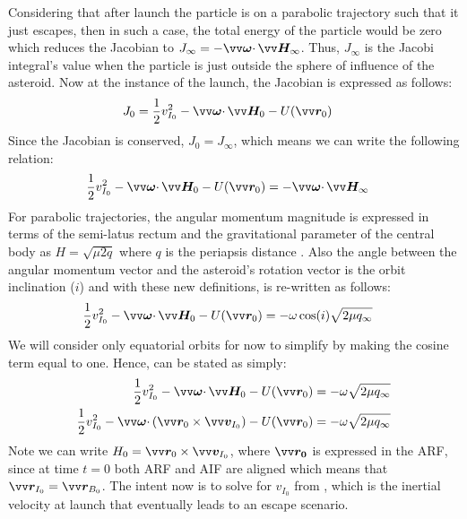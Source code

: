 Considering that after launch the particle is on a parabolic trajectory such that it just escapes, then in such a case, the total energy of the particle would be zero which reduces the Jacobian to $J_{\infty} = -\bv{\omega} \cdotp \bv{H}_{\infty}$. Thus, $J_{\infty}$ is the Jacobi integral's value when the particle is just outside the sphere of influence of the asteroid. Now at the instance of the launch, the Jacobian is expressed as follows:
\begin{align}
    J_0 &= \frac{1}{2} v_{I_0}^2 - \bv{\omega} \cdotp \bv{H}_0 - U(\bv{r}_0)
    \label{eqn:jacobian_t0}
\end{align}
Since the Jacobian is conserved, $J_0 = J_{\infty}$, which means we can write the following relation:
\begin{align}
    \frac{1}{2} v_{I_0}^2 - \bv{\omega} \cdotp \bv{H}_0 - U(\bv{r}_0) &= -\bv{\omega} \cdotp \bv{H}_{\infty}
    \label{eqn:jacobian_equate}
\end{align}
For parabolic trajectories, the angular momentum magnitude is expressed in terms of the semi-latus rectum and the gravitational parameter of the central body as $H = \sqrt{\mu 2q}$ where $q$ is the periapsis distance \parencite{schaub2003Book}. Also the angle between the angular momentum vector and the asteroid's rotation vector is the orbit inclination ($i$) and with these new definitions,  is re-written as follows:
\begin{align}
    \frac{1}{2} v_{I_0}^2 - \bv{\omega} \cdotp \bv{H}_0 - U(\bv{r}_0) &= -\omega \cos(i) \sqrt{2\mu q_{\infty}}
    \label{eqn:jacobian_equate_cosi}
\end{align}
We will consider only equatorial orbits for now to simplify  by making the cosine term equal to one. Hence,  can be stated as simply:
\begin{align}
    \frac{1}{2} v_{I_0}^2 - \bv{\omega} \cdotp \bv{H}_0 - U(\bv{r}_0) &= -\omega \sqrt{2\mu q_{\infty}} \\
    \frac{1}{2} v_{I_0}^2 - \bv{\omega} \cdotp (\bv{r}_0 \times \bv{v}_{I_0}) - U(\bv{r}_0) &= -\omega \sqrt{2\mu q_{\infty}}
    \label{eqn:jacobian_equate_equatorial}
\end{align}
Note we can write $H_0 = \bv{r}_0 \times \bv{v}_{I_0}$, where $\bv{r_0}$ is expressed in the \gls{ARF}, since at time $t = 0$ both \gls{ARF} and \gls{AIF} are aligned which means that $\bv{r}_{I_0} = \bv{r}_{B_0}$. The intent now is to solve for $v_{I_0}$ from , which is the inertial velocity at launch that eventually leads to an escape scenario.

